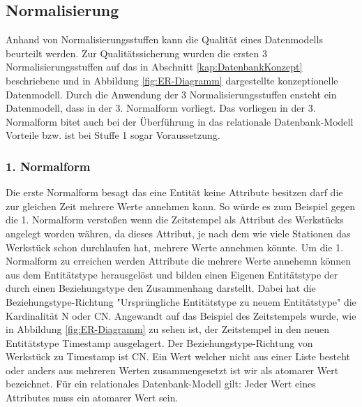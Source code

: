 \subsection{Normalisierung}
Anhand von Normalisierungsstuffen kann die Qualität eines Datenmodells beurteilt werden. Zur Qualitätssicherung wurden die ersten 3 Normalisierungsstuffen auf das in Abschnitt \ref{kap:DatenbankKonzept} beschriebene und in Abbildung \ref{fig:ER-Diagramm} dargestellte konzeptionelle Datenmodell. Durch die Anwendung der 3 Normalisierungsstuffen ensteht ein Datenmodell, dass in der 3. Normalform vorliegt. Das vorliegen in der 3. Normalform bitet auch bei der Überführung in das relationale Datenbank-Modell Vorteile bzw. ist bei Stuffe 1 sogar Voraussetzung.

\subsubsection*{1. Normalform}
Die erste Normalform besagt das eine Entität keine Attribute besitzen darf die zur gleichen Zeit mehrere Werte annehmen kann. So würde es zum Beispiel gegen die 1. Normalform verstoßen wenn die Zeitstempel als Attribut des Werkstücks angelegt worden währen, da dieses Attribut, je nach dem wie viele Stationen das Werkstück schon durchlaufen hat, mehrere Werte annehmen könnte. Um die 1. Normalform zu erreichen werden Attribute die mehrere Werte annehemn können aus dem Entitätstype herausgelöst und bilden einen Eigenen Entitätstype der durch einen Beziehungstype den Zusammenhang darstellt. Dabei hat die Beziehungstype-Richtung "Ursprüngliche Entitätstype zu neuem Entitätstype" die Kardinalität N oder CN.
Angewandt auf das Beispiel des Zeitstempels wurde, wie in Abbildung \ref{fig:ER-Diagramm} zu sehen ist, der Zeitstempel in den neuen Entitätstype Timestamp ausgelagert. Der Beziehungstype-Richtung von Werkstück zu Timestamp ist CN.
Ein Wert welcher nicht aus einer Liste besteht oder anders aus mehreren Werten zusammengesetzt ist wir als atomarer Wert bezeichnet. Für ein relationales Datenbank-Modell gilt: Jeder Wert eines Attributes muss ein atomarer Wert sein.\cite{Jarosch:2016}

